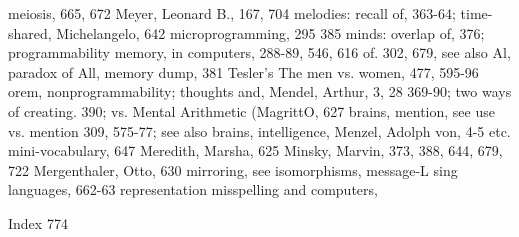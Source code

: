 meiosis, 665, 672                               Meyer,      Leonard      B.,    167,      704
melodies: recall of, 363-64; time-shared,       Michelangelo, 642 microprogramming, 295
385                                             minds: overlap of, 376; programmability
memory, in computers, 288-89, 546, 616          of. 302, 679, see also Al, paradox of All,
memory dump, 381                                Tesler's The
men vs. women, 477, 595-96                      orem, nonprogrammability; thoughts and,
Mendel, Arthur, 3, 28                           369-90; two ways of creating. 390; vs.
Mental Arithmetic (MagrittO, 627                brains,
mention, see use vs. mention                    309, 575-77; see also brains, intelligence,
Menzel, Adolph von, 4-5                         etc. mini-vocabulary, 647
Meredith, Marsha, 625                           Minsky, Marvin, 373, 388, 644, 679, 722
Mergenthaler, Otto, 630                         mirroring,         see        isomorphisms,
message-L       sing languages, 662-63          representation misspelling and computers,



Index                                                                                    774

